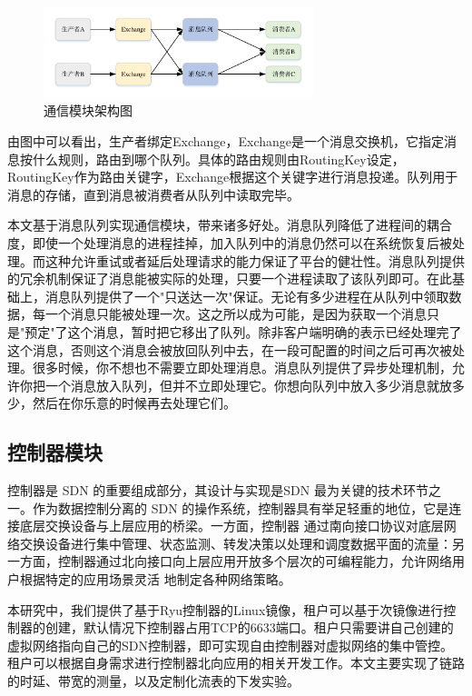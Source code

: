 \begin{figure}[!htb]
  \centering
  \includegraphics[width=0.7\textwidth]{logo/rabbitmq}
  \caption{通信模块架构图}
  \label{fig:rabbitmq}
\end{figure}

由图中可以看出，生产者绑定Exchange，Exchange是一个消息交换机，它指定消息按什么规则，路由到哪个队列。具体的路由规则由RoutingKey设定，RoutingKey作为路由关键字，Exchange根据这个关键字进行消息投递。队列用于消息的存储，直到消息被消费者从队列中读取完毕。

本文基于消息队列实现通信模块，带来诸多好处。消息队列降低了进程间的耦合度，即使一个处理消息的进程挂掉，加入队列中的消息仍然可以在系统恢复后被处理。而这种允许重试或者延后处理请求的能力保证了平台的健壮性。消息队列提供的冗余机制保证了消息能被实际的处理，只要一个进程读取了该队列即可。在此基础上，消息队列提供了一个"只送达一次"保证。无论有多少进程在从队列中领取数据，每一个消息只能被处理一次。这之所以成为可能，是因为获取一个消息只是"预定"了这个消息，暂时把它移出了队列。除非客户端明确的表示已经处理完了这个消息，否则这个消息会被放回队列中去，在一段可配置的时间之后可再次被处理。很多时候，你不想也不需要立即处理消息。消息队列提供了异步处理机制，允许你把一个消息放入队列，但并不立即处理它。你想向队列中放入多少消息就放多少，然后在你乐意的时候再去处理它们。

\subsection{控制器模块}
控制器是 SDN 的重要组成部分，其设计与实现是SDN 最为关键的技术环节之一。作为数据控制分离的
SDN 的操作系统，控制器具有举足轻重的地位，它是连接底层交换设备与上层应用的桥梁。一方面，控制器
通过南向接口协议对底层网络交换设备进行集中管理、状态监测、转发决策以处理和调度数据平面的流量：另
一方面，控制器通过北向接口向上层应用开放多个层次的可编程能力，允许网络用户根据特定的应用场景灵活
地制定各种网络策略。

本研究中，我们提供了基于Ryu控制器的Linux镜像，租户可以基于次镜像进行控制器的创建，默认情况下控制器占用TCP的6633端口。租户只需要讲自己创建的虚拟网络指向自己的SDN控制器，即可实现自由控制器对虚拟网络的集中管控。租户可以根据自身需求进行控制器北向应用的相关开发工作。本文主要实现了链路的时延、带宽的测量，以及定制化流表的下发实验。

